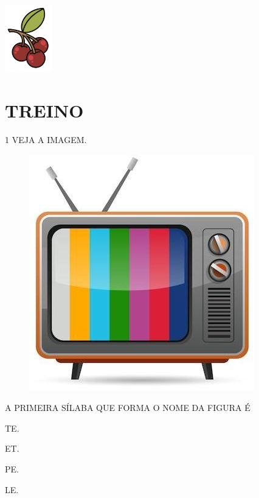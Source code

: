 \begin{escolha}
\item \includegraphics[width=0.8in]{media/image103.png}\\
\end{escolha}


\section*{TREINO}


\num{1} VEJA A IMAGEM.

\begin{figure}[H]
\centering
\includegraphics[width=.6\textwidth]{media/image123.jpg}
\end{figure}

A PRIMEIRA SÍLABA QUE FORMA O NOME DA FIGURA É

\begin{multicols}{2}
\begin{escolha}
\item TE.

\item ET.

\item PE.

\item LE.
\end{escolha}
\end{multicols}



